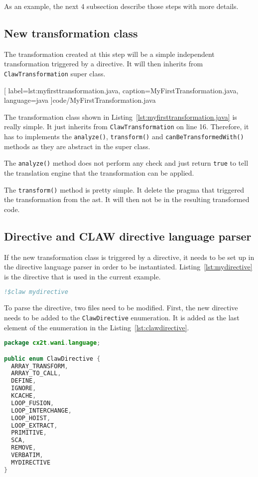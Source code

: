 As an example, the next 4 subsection describe those steps with more details.

\subsection{New transformation class}
The transformation created at this step will be a simple independent
transformation triggered by a directive. It will then inherits from
\lstinline|ClawTransformation| super class.


  [
    label=lst:myfirsttransformation.java,
    caption=MyFirstTransformation.java,
    language=java
  ]{code/MyFirstTransformation.java}

The transformation class shown in Listing~\ref{lst:myfirsttransformation.java}
is really simple. It just inherits from \lstinline|ClawTransformation| on line
16. Therefore, it has to implements the \lstinline|analyze()|,
\lstinline|transform()| and \lstinline|canBeTransformedWith()| methods as they
are abstract in the super class.

The \lstinline|analyze()| method does not perform any check and just return
\lstinline|true| to tell the translation engine that the transformation can
be applied.

The \lstinline|transform()| method is pretty simple. It delete the pragma that
triggered the transformation from the \gls{ast}. It will then not be in the
resulting transformed code.

\subsection{Directive and CLAW directive language parser}
If the new transformation class is triggered by a directive, it needs to
be set up in the directive language parser in order to be instantiated.
Listing~\ref{lst:mydirective} is the directive that is used in
the current example.

\begin{lstlisting}[label=lst:mydirective, caption=Example directive,
  language=fortran]
!$claw mydirective
\end{lstlisting}

To parse the directive, two files need to be modified. First, the new directive
needs to be added to the \lstinline|ClawDirective| enumeration. It is added as
the last element of the enumeration in the Listing~\ref{lst:clawdirective}.

\begin{lstlisting}[label=lst:clawdirective, caption=ClawDirective.java,
  language=java]
package cx2t.wani.language;

public enum ClawDirective {
  ARRAY_TRANSFORM,
  ARRAY_TO_CALL,
  DEFINE,
  IGNORE,
  KCACHE,
  LOOP_FUSION,
  LOOP_INTERCHANGE,
  LOOP_HOIST,
  LOOP_EXTRACT,
  PRIMITIVE,
  SCA,
  REMOVE,
  VERBATIM,
  MYDIRECTIVE
}
\end{lstlisting}

